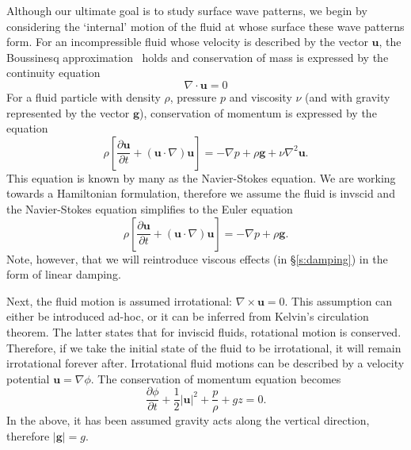 Although our ultimate goal is to study surface wave patterns, we begin by considering the `internal' motion of the fluid at whose surface these wave patterns form. For an incompressible fluid whose velocity is described by the vector $\boldsymbol{u}$, the Boussinesq approximation~\citep{kundu90:_fluid_mechan} holds and conservation of mass is expressed by the continuity equation
\begin{equation}
\nabla \cdot \boldsymbol{u}= 0 \label{e:Cons Mass}
\end{equation}
For a fluid particle with density $\rho$, pressure $p$ and viscosity $\nu$ (and with gravity represented by the vector $\boldsymbol{g}$), conservation of momentum is expressed by the equation
\begin{equation}
\rho \left[ \frac{\partial \boldsymbol{u}}{\partial t} + (\boldsymbol{u} \cdot \nabla )\boldsymbol{u} \right] = - \nabla p + \rho \boldsymbol{g}+ \nu \nabla^2 \boldsymbol{u}. 
\end{equation}
This equation is known by many as the Navier-Stokes equation. We are working towards a Hamiltonian formulation, therefore we assume the fluid is invscid and the Navier-Stokes equation simplifies to the Euler equation
\begin{equation}
\rho \left[ \frac{\partial \boldsymbol{u}}{\partial t} + (\boldsymbol{u} \cdot \nabla )\boldsymbol{u} \right] = - \nabla p + \rho \boldsymbol{g}.
\end{equation}
Note, however, that we will reintroduce viscous effects (in \S\ref{s:damping}) in the form of linear damping.

Next, the fluid motion is assumed irrotational: $\nabla \times \boldsymbol{u}= 0$. This assumption can either be introduced ad-hoc, or it can be inferred from Kelvin's circulation theorem. The latter states that for inviscid fluids, rotational motion is conserved. Therefore, if we take the initial state of the fluid to be irrotational, it will remain irrotational forever after. Irrotational fluid motions can be described by a velocity potential $\boldsymbol{u}= \nabla \phi$. The conservation of momentum equation becomes
\begin{equation}
\frac{\partial \phi}{\partial t} + \frac12 |\boldsymbol{u}|^2 + \frac{p}{\rho} + g z = 0.
\end{equation}
In the above, it has been assumed gravity acts along the vertical direction, therefore $|\boldsymbol{g}|=g$.

